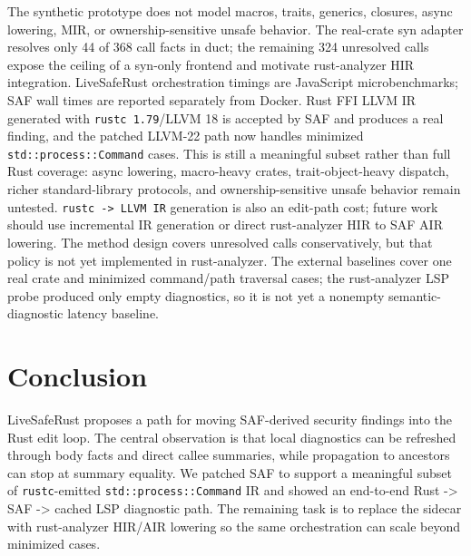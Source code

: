 \documentclass[sigconf,nonacm]{acmart}
\begin{document}
The synthetic prototype does not model macros, traits, generics, closures,
async lowering, MIR, or ownership-sensitive unsafe behavior. The real-crate
syn adapter resolves only 44 of 368 call facts in duct; the remaining 324
unresolved calls expose the ceiling of a syn-only frontend and motivate
rust-analyzer HIR integration. LiveSafeRust orchestration timings are
JavaScript microbenchmarks; SAF wall times are reported separately from Docker.
Rust FFI LLVM IR generated with \texttt{rustc 1.79}/LLVM 18 is accepted by SAF
and produces a real finding, and the patched LLVM-22 path now handles minimized
\texttt{std::process::Command} cases. This is still a meaningful subset rather
than full Rust coverage: async lowering, macro-heavy crates, trait-object-heavy
dispatch, richer standard-library protocols, and ownership-sensitive unsafe
behavior remain untested. \texttt{rustc -> LLVM IR} generation is also an
edit-path cost; future work should use incremental IR generation or direct
rust-analyzer HIR to SAF AIR lowering. The method design covers unresolved calls
conservatively, but that policy is not yet implemented in rust-analyzer. The
external baselines cover one real crate and minimized command/path traversal
cases; the rust-analyzer LSP probe produced only empty diagnostics, so it is not
yet a nonempty semantic-diagnostic latency baseline.

\section{Conclusion}

LiveSafeRust proposes a path for moving SAF-derived security findings into the
Rust edit loop. The central observation is that local diagnostics can be
refreshed through body facts and direct callee summaries, while propagation to
ancestors can stop at summary equality. We patched SAF to support a meaningful
subset of \texttt{rustc}-emitted \texttt{std::process::Command} IR and showed an
end-to-end Rust -> SAF -> cached LSP diagnostic path. The remaining task is to
replace the sidecar with rust-analyzer HIR/AIR lowering so the same orchestration
can scale beyond minimized cases.
\end{document}
